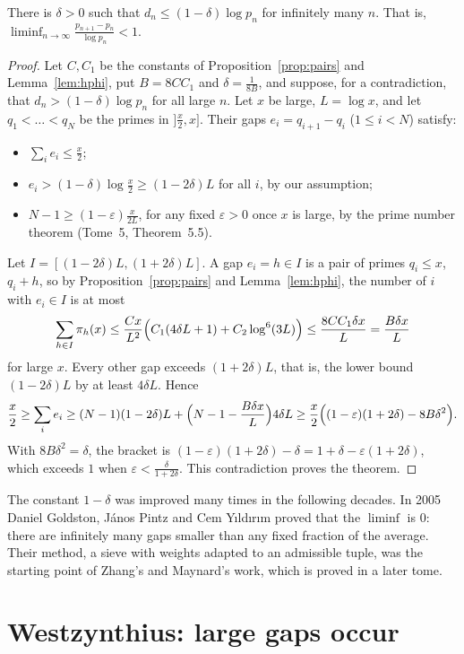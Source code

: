 \begin{theorem}[Erd\H{o}s, 1940]\label{thm:erdossmall}
There is $\delta>0$ such that $d_n\le(1-\delta)\log p_n$ for infinitely many $n$. That is, $\displaystyle\liminf_{n\to\infty}\frac{p_{n+1}-p_n}{\log p_n}<1$.
\end{theorem}
\begin{proof}
Let $C,C_1$ be the constants of Proposition~\ref{prop:pairs} and Lemma~\ref{lem:hphi}, put $B=8CC_1$ and $\delta=\frac1{8B}$, and suppose, for a
contradiction, that $d_n>(1-\delta)\log p_n$ for all large $n$. Let $x$ be large, $L=\log x$, and let $q_1<\dots<q_N$ be the primes in $]\frac x2,x]$.
Their gaps $e_i=q_{i+1}-q_i$ ($1\le i<N$) satisfy:
\begin{itemize}
\item $\sum_ie_i\le\frac x2$;
\item $e_i>(1-\delta)\log\frac x2\ge(1-2\delta)L$ for all $i$, by our assumption;
\item $N-1\ge(1-\varepsilon)\frac x{2L}$, for any fixed $\varepsilon>0$ once $x$ is large, by the prime number theorem (Tome~5, Theorem~5.5).
\end{itemize}
Let $I=[(1-2\delta)L,(1+2\delta)L]$. A gap $e_i=h\in I$ is a pair of primes $q_i\le x$, $q_i+h$, so by Proposition~\ref{prop:pairs} and
Lemma~\ref{lem:hphi}, the number of $i$ with $e_i\in I$ is at most
\[
\sum_{h\in I}\pi_h(x)\le\frac{Cx}{L^2}\Bigl(C_1(4\delta L+1)+C_2\log^6(3L)\Bigr)\le\frac{8CC_1\delta x}L=\frac{B\delta x}L
\]
for large $x$. Every other gap exceeds $(1+2\delta)L$, that is, the lower bound $(1-2\delta)L$ by at least $4\delta L$. Hence
\[
\frac x2\ge\sum_ie_i\ge(N-1)(1-2\delta)L+\Bigl(N-1-\frac{B\delta x}L\Bigr)4\delta L\ge\frac x2\Bigl((1-\varepsilon)(1+2\delta)-8B\delta^2\Bigr).
\]
With $8B\delta^2=\delta$, the bracket is $(1-\varepsilon)(1+2\delta)-\delta=1+\delta-\varepsilon(1+2\delta)$, which exceeds $1$ when $\varepsilon<\frac\delta{1+2\delta}$.
This contradiction proves the theorem.
\end{proof}

The constant $1-\delta$ was improved many times in the following decades. In 2005 Daniel Goldston, J\'anos Pintz and Cem Y\i ld\i r\i m proved that the
$\liminf$ is $0$: there are infinitely many gaps smaller than any fixed fraction of the average. Their method, a sieve with weights adapted to an
admissible tuple, was the starting point of Zhang's and Maynard's work, which is proved in a later tome.

\section{Westzynthius: large gaps occur}

